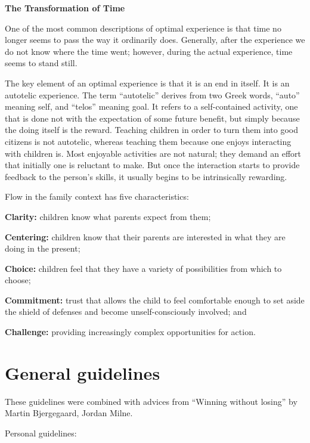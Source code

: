 \textbf{The Transformation of Time}

One of the most common descriptions of optimal experience is that time no longer seems to pass the way it ordinarily does. Generally, after the experience we do not know where the time went; however, during the actual experience, time seems to stand still.

The key element of an optimal experience is that it is an end in itself. It is an autotelic experience. The term ``autotelic'' derives from two Greek words, ``auto'' meaning self, and ``telos'' meaning goal. It refers to a self-contained activity, one that is done not with the expectation of some future benefit, but simply because the doing itself is the reward. Teaching children in order to turn them into good citizens is not autotelic, whereas teaching them because one enjoys interacting with children is. Most enjoyable activities are not natural; they demand an effort that initially one is reluctant to make. But once the interaction starts to provide feedback to the person's skills, it usually begins to be intrinsically rewarding.

Flow in the family context has five characteristics:
\begin{compactitem}
\item \textbf{Clarity:} children know what parents expect from them; 
\item \textbf{Centering:} children know that their parents are interested in what they are doing in the present;
\item \textbf{Choice:} children feel that they have a variety of possibilities from which to choose;
\item \textbf{Commitment:} trust that allows the child to feel comfortable enough to set aside the shield of defenses and become unself-consciously involved; and
\item \textbf{Challenge:} providing increasingly complex opportunities for action.
\end{compactitem}

\section{General guidelines}

These guidelines were combined with advices from ``Winning without losing'' by Martin Bjergegaard, Jordan Milne.

Personal guidelines:


